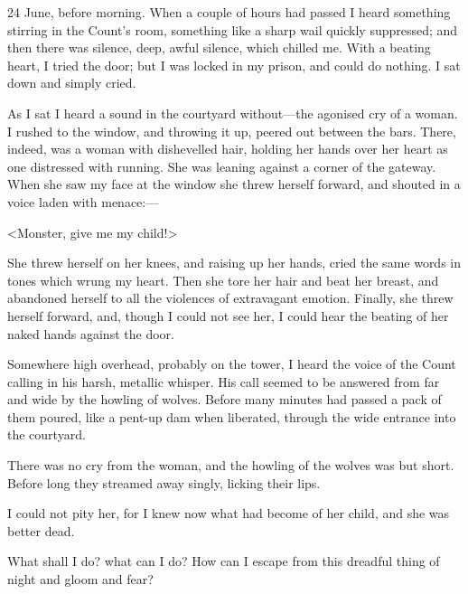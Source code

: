 \begin{diary}{24 June, before morning.}
When a couple of hours had passed I heard something stirring in the Count's room, something like a sharp wail quickly suppressed; and then there was silence, deep, awful silence, which chilled me. With a beating heart, I tried the door; but I was locked in my prison, and could do nothing. I sat down and simply cried.

As I sat I heard a sound in the courtyard without—the agonised cry of a woman. I rushed to the window, and throwing it up, peered out between the bars. There, indeed, was a woman with dishevelled hair, holding her hands over her heart as one distressed with running. She was leaning against a corner of the gateway. When she saw my face at the window she threw herself forward, and shouted in a voice laden with menace:—

<Monster, give me my child!>

She threw herself on her knees, and raising up her hands, cried the same words in tones which wrung my heart. Then she tore her hair and beat her breast, and abandoned herself to all the violences of extravagant emotion. Finally, she threw herself forward, and, though I could not see her, I could hear the beating of her naked hands against the door.

Somewhere high overhead, probably on the tower, I heard the voice of the Count calling in his harsh, metallic whisper. His call seemed to be answered from far and wide by the howling of wolves. Before many minutes had passed a pack of them poured, like a pent-up dam when liberated, through the wide entrance into the courtyard.

There was no cry from the woman, and the howling of the wolves was but short. Before long they streamed away singly, licking their lips.

I could not pity her, for I knew now what had become of her child, and she was better dead.

What shall I do? what can I do? How can I escape from this dreadful thing of night and gloom and fear?
\end{diary}
 
